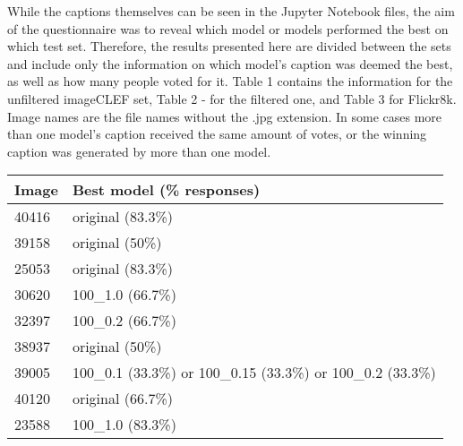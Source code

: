 \documentclass[11pt]{article}
\begin{document}
While the captions themselves can be seen in the Jupyter Notebook files, the aim of the questionnaire was to reveal which model or models performed the best on which test set. Therefore, the results presented here are divided between the sets and include only the information on which model's caption was deemed the best, as well as how many people voted for it. Table 1 contains the information for the unfiltered imageCLEF set, Table 2 - for the filtered one, and Table 3 for Flickr8k. Image names are the file names without the .jpg extension. In some cases more than one model's caption received the same amount of votes, or the winning caption was generated by more than one model.

\begin{table}[h]
    \begin{center}
        \begin{tabular}{|p{1cm}|p{4.5cm}|}
            \hline \bf Image & \bf Best model (\% responses)                                                                 \\ \hline
            40416            & original (83.3\%)                                                                             \\
            39158            & original (50\%)                                                                               \\
            25053            & original (83.3\%)                                                                             \\
            30620            & 100\_1.0 (66.7\%)                                                                             \\
            32397            & 100\_0.2 (66.7\%)                                                                             \\
            38937            & original (50\%)                                                                               \\
            39005            & 100\_0.1 (33.3\%) or 100\_0.15 (33.3\%) or 100\_0.2 (33.3\%)                                  \\
            40120            & original (66.7\%)                                                                             \\
            23588            & 100\_1.0 (83.3\%)                                                                             \\

\end{tabular}
\end{center}
\end{table}
\end{document}
